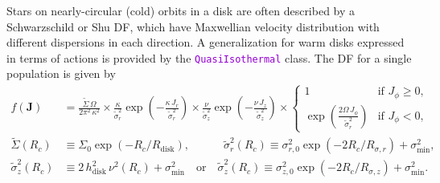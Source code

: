 \documentclass[12pt]{article}
\newcommand{\ttt}[1]{\textcolor{darkviolet}{\texttt{#1}}}
\newcommand{\bJ}{\boldsymbol{J}}
\begin{document}
Stars on nearly-circular (cold) orbits in a disk are often described by a Schwarzschild or Shu DF, which have Maxwellian velocity distribution with different dispersions in each direction. A generalization for warm disks \cite{Dehnen1999} expressed in terms of actions \cite{BinneyMcMillan2011} is provided by the \ttt{QuasiIsothermal} class. The DF for a single population is given by
\begin{align*}
f(\bJ) &= \frac{\tilde\Sigma\,\Omega}{2\pi^2\,\kappa^2} \times
\frac{\kappa}{\tilde\sigma_r^2} \exp\left(-\frac{\kappa\,J_r}{\tilde\sigma_r^2}\right) \times
\frac{\nu}   {\tilde\sigma_z^2} \exp\left(-\frac{\nu\,   J_z}{\tilde\sigma_z^2}\right) \times
\left\{ \begin{array}{ll}  1 & \mbox{if }J_\phi\ge 0, \\
\exp\left( \frac{2\Omega\,J_\phi}{\tilde\sigma_r^2} \right) & \mbox{if }J_\phi<0, \end{array} \right. \\
\tilde\Sigma(R_c)  &\equiv \Sigma_0 \exp( -R_c / R_\mathrm{disk} ) , \qquad\quad
\tilde\sigma_r^2(R_c) \equiv \sigma_{r,0}^2 \exp( -2R_c / R_{\sigma,r} ) + \sigma_\mathrm{min}^2,\\
\tilde\sigma_z^2(R_c)&\equiv 2\,h_\mathrm{disk}^2\,\nu^2(R_c)  + \sigma_\mathrm{min}^2
\quad\mbox{or}\quad
\tilde\sigma_z^2(R_c) \equiv \sigma_{z,0}^2 \exp( -2R_c / R_{\sigma,z} )  + \sigma_\mathrm{min}^2.
\end{align*}
\end{document}
